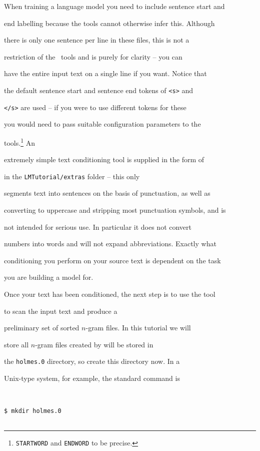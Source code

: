 When training a language model you need to include sentence start and


end labelling because the tools cannot otherwise infer this.  Although


there is only one sentence per line in these files, this is not a


restriction of the \HTK\ tools and is purely for clarity -- you can


have the entire input text on a single line if you want.  Notice that


the default sentence start and sentence end tokens of {\tt <s>} and


{\tt </s>} are used -- if you were to use different tokens for these


you would need to pass suitable configuration parameters to the \HTK\


tools.\footnote{{\tt STARTWORD} and {\tt ENDWORD} to be precise.}  An


extremely simple text conditioning tool is supplied in the form of


 in the {\tt LMTutorial/extras} folder -- this only


segments text into sentences on the basis of punctuation, as well as


converting to uppercase and stripping most punctuation symbols, and is


not intended for serious use.  In particular it does not convert


numbers into words and will not expand abbreviations.  Exactly what


conditioning you perform on your source text is dependent on the task


you are building a model for.





Once your text has been conditioned, the next step is to use the tool


 to scan the input text and produce a


preliminary set of sorted $n$-gram files.  In this tutorial we will


store all $n$-gram files created by  will be stored in


the \texttt{holmes.0} directory, so create this directory now.  In a


Unix-type system, for example, the standard command is


\begin{verbatim}


$ mkdir holmes.0


\end{verbatim} %





